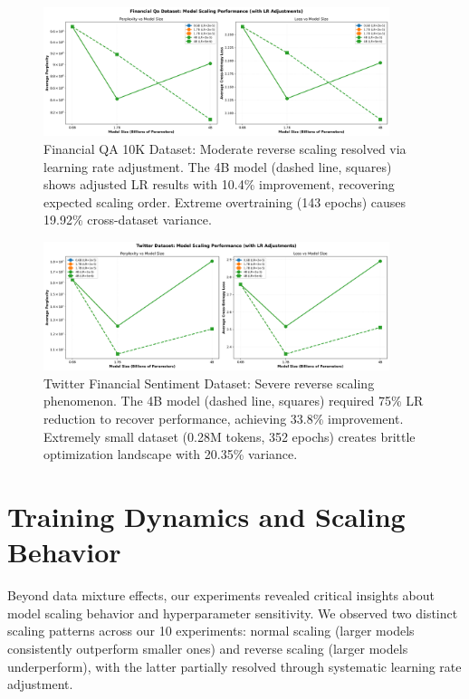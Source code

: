 \begin{figure}[htbp]
\centering
\includegraphics[width=0.9\textwidth]{figures/scaling_financial_qa.png}
\caption[Financial QA 10K Dataset: Reverse Scaling]{Financial QA 10K Dataset: Moderate reverse scaling resolved via learning rate adjustment. The 4B model (dashed line, squares) shows adjusted LR results with 10.4\% improvement, recovering expected scaling order. Extreme overtraining (143 epochs) causes 19.92\% cross-dataset variance.}
\label{fig:scaling_financial_qa}
\end{figure}

\begin{figure}[htbp]
\centering
\includegraphics[width=0.9\textwidth]{figures/scaling_twitter.png}
\caption[Twitter Financial Sentiment Dataset: Reverse Scaling]{Twitter Financial Sentiment Dataset: Severe reverse scaling phenomenon. The 4B model (dashed line, squares) required 75\% LR reduction to recover performance, achieving 33.8\% improvement. Extremely small dataset (0.28M tokens, 352 epochs) creates brittle optimization landscape with 20.35\% variance.}
\label{fig:scaling_twitter}
\end{figure}






\section{Training Dynamics and Scaling Behavior}

Beyond data mixture effects, our experiments revealed critical insights about model scaling behavior and hyperparameter sensitivity. We observed two distinct scaling patterns across our 10 experiments: normal scaling (larger models consistently outperform smaller ones) and reverse scaling (larger models underperform), with the latter partially resolved through systematic learning rate adjustment.

